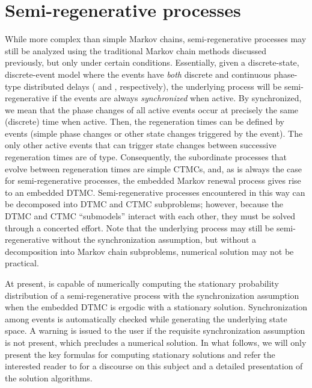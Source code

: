 \section{Semi-regenerative processes}\label{SEC:semi-regen-processes}
While more complex than simple Markov chains,
semi-regenerative processes may still be analyzed using
the traditional Markov chain methods discussed previously, but only under certain conditions.
Essentially, given a discrete-state, discrete-event model where the events have \emph{both}
discrete and continuous phase-type distributed delays
( and , respectively),
the underlying process will be semi-regenerative
if the  events are always \emph{synchronized} when active.
By synchronized,
we mean that the phase changes of all active  events occur at precisely the
same (discrete) time when active.
Then, the regeneration times can be defined by  events
(simple phase changes or other state changes triggered by the event).
The only other active events that can trigger state changes between successive regeneration times
are of  type.  Consequently, the subordinate processes that evolve between
regeneration times are simple CTMCs, and, as is always the case for semi-regenerative processes,
the embedded Markov renewal process gives rise to an embedded DTMC.
Semi-regenerative processes encountered in this way can be decomposed into
DTMC and CTMC subproblems; however, because the DTMC and CTMC ``submodels'' interact
with each other, they must be solved through a concerted effort.
Note that the underlying process may still be semi-regenerative without the synchronization
assumption, but without a decomposition into Markov chain subproblems, numerical solution
may not be practical.

At present, {\smart} is capable of numerically computing the stationary probability distribution
of a semi-regenerative process with the synchronization assumption when
the embedded DTMC is ergodic with a stationary solution.
Synchronization among  events is automatically checked while generating the
underlying state space.  A warning is issued to the user if the requisite synchronization
assumption is not present, which precludes a numerical solution.
In what follows, we will only present the key formulas for computing stationary solutions
and refer the interested reader to \cite{Jones-NASA-00}
for a discourse on this subject and a detailed presentation of the solution algorithms.

